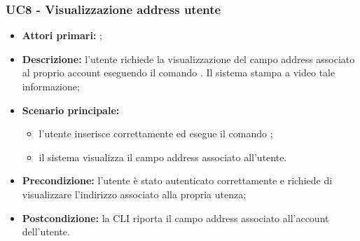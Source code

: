 \subsubsection{UC8 - Visualizzazione address utente}
\begin{itemize}
	\item \textbf{Attori primari:} \ua{};
	\item \textbf{Descrizione:} l’utente richiede la visualizzazione del campo address associato al proprio account eseguendo il comando \whoami{}. Il sistema stampa a video tale informazione; 
	\item \textbf{Scenario principale:} 
		\begin{itemize}
			\item l'utente inserisce correttamente ed esegue il comando \whoami{}; 
			\item il sistema visualizza il campo address associato all’utente.
		\end{itemize}
	\item \textbf{Precondizione:} l’utente è stato autenticato correttamente e richiede di visualizzare l’indirizzo associato alla propria utenza;
	\item \textbf{Postcondizione:} la CLI riporta il campo address associato all’account dell’utente.
\end{itemize}